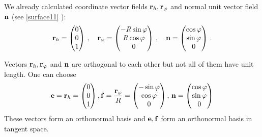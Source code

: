 \documentclass[12pt]{article}
\theoremstyle{theorem}
\numberwithin{equation}{section}
\begin{document}
 We already calculated coordinate vector fields ${\bf r}_h,{\bf r}_\varphi$ and normal unit vector field
${\bf n}$ (see \eqref{surface11} ):
 \begin{equation}\label{surface115}
    {\bf r}_h=
  \begin{pmatrix}
        0\\
        0\\
        1\\
   \end{pmatrix}\,,
\quad
  {\bf r}_\varphi=\begin{pmatrix}
        -R\sin\varphi\\
        R\cos\varphi\\
          0\\
   \end{pmatrix}\,,\quad
      {\bf n}=\begin{pmatrix}
        \cos \varphi\cr
        \sin\varphi\cr
        0\cr
   \end{pmatrix}\,.
\end{equation}

Vectors ${\bf r}_h,{\bf r}_\varphi$ and ${\bf n}$ are orthogonal to each other but not all of them have unit length. One can choose
           \begin{equation}\label{nonholonombasisfor cylinder}
        {\bf e}={\bf r}_h=  \begin{pmatrix}
        0\cr
        0\cr
        1\cr
   \end{pmatrix},
   {\bf f}={{\bf r}_\varphi\over R}=\begin{pmatrix}
        -\sin\varphi\cr
        \cos\varphi\cr
          0\cr
   \end{pmatrix},\,{\bf n}=\begin{pmatrix}
        \cos \varphi\cr
        \sin\varphi\cr
        0\cr
   \end{pmatrix}
           \end{equation}
   These vectors form an orthonormal basis and ${\bf e},{\bf f}$  form an orthonormal basis in tangent space.
\end{document}
